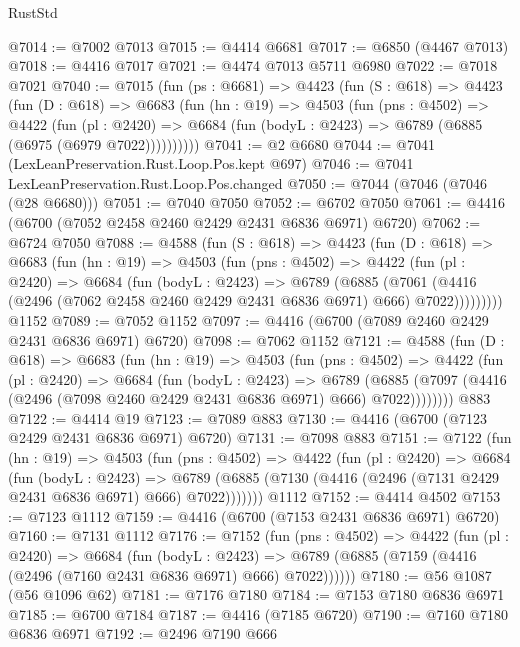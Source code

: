 \begin{lexlean}{RustStd}
\begin{coremodule}
@7014 := @7002 @7013
@7015 := @4414 @6681
@7017 := @6850 (@4467 @7013)
@7018 := @4416 @7017
@7021 := @4474 @7013 @5711 @6980
@7022 := @7018 @7021
@7040 := @7015
    (fun (ps : @6681) =>
    @4423
      (fun (S : @618) =>
      @4423
        (fun (D : @618) =>
        @6683
          (fun (hn : @19) =>
          @4503
            (fun (pns : @4502) =>
            @4422
              (fun (pl : @2420) =>
              @6684 (fun (bodyL : @2423) => @6789 (@6885 (@6975 (@6979 @7022))))))))))
@7041 := @2 @6680
@7044 := @7041 (LexLeanPreservation.Rust.Loop.Pos.kept @697)
@7046 := @7041 LexLeanPreservation.Rust.Loop.Pos.changed
@7050 := @7044 (@7046 (@7046 (@28 @6680)))
@7051 := @7040 @7050
@7052 := @6702 @7050
@7061 := @4416 (@6700 (@7052 @2458 @2460 @2429 @2431 @6836 @6971) @6720)
@7062 := @6724 @7050
@7088 := @4588
    (fun (S : @618) =>
    @4423
      (fun (D : @618) =>
      @6683
        (fun (hn : @19) =>
        @4503
          (fun (pns : @4502) =>
          @4422
            (fun (pl : @2420) =>
            @6684
              (fun (bodyL : @2423) =>
              @6789
                (@6885
                  (@7061
                    (@4416 (@2496 (@7062 @2458 @2460 @2429 @2431 @6836 @6971) @666) @7022)))))))))
    @1152
@7089 := @7052 @1152
@7097 := @4416 (@6700 (@7089 @2460 @2429 @2431 @6836 @6971) @6720)
@7098 := @7062 @1152
@7121 := @4588
    (fun (D : @618) =>
    @6683
      (fun (hn : @19) =>
      @4503
        (fun (pns : @4502) =>
        @4422
          (fun (pl : @2420) =>
          @6684
            (fun (bodyL : @2423) =>
            @6789
              (@6885 (@7097 (@4416 (@2496 (@7098 @2460 @2429 @2431 @6836 @6971) @666) @7022))))))))
    @883
@7122 := @4414 @19
@7123 := @7089 @883
@7130 := @4416 (@6700 (@7123 @2429 @2431 @6836 @6971) @6720)
@7131 := @7098 @883
@7151 := @7122
    (fun (hn : @19) =>
    @4503
      (fun (pns : @4502) =>
      @4422
        (fun (pl : @2420) =>
        @6684
          (fun (bodyL : @2423) =>
          @6789 (@6885 (@7130 (@4416 (@2496 (@7131 @2429 @2431 @6836 @6971) @666) @7022)))))))
    @1112
@7152 := @4414 @4502
@7153 := @7123 @1112
@7159 := @4416 (@6700 (@7153 @2431 @6836 @6971) @6720)
@7160 := @7131 @1112
@7176 := @7152
    (fun (pns : @4502) =>
    @4422
      (fun (pl : @2420) =>
      @6684
        (fun (bodyL : @2423) =>
        @6789 (@6885 (@7159 (@4416 (@2496 (@7160 @2431 @6836 @6971) @666) @7022))))))
@7180 := @56 @1087 (@56 @1096 @62)
@7181 := @7176 @7180
@7184 := @7153 @7180 @6836 @6971
@7185 := @6700 @7184
@7187 := @4416 (@7185 @6720)
@7190 := @7160 @7180 @6836 @6971
@7192 := @2496 @7190 @666

\end{coremodule}
\end{lexlean}
